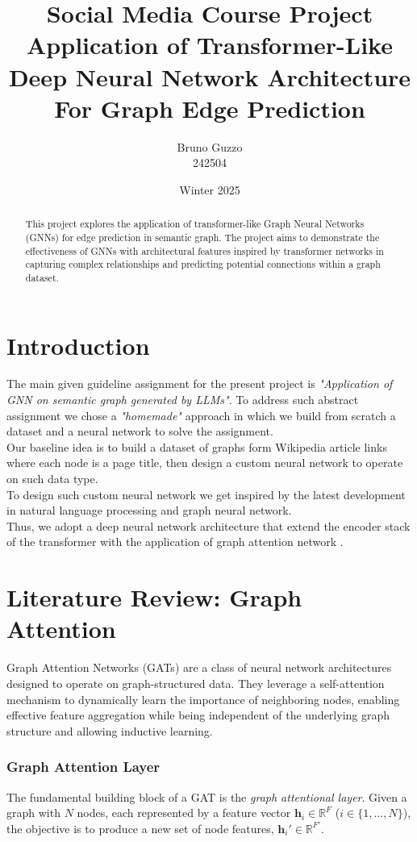 \documentclass[11pt]{article}
\title{Social Media Course Project \\ [1em] \Large Application of Transformer-Like Deep Neural Network Architecture For Graph Edge Prediction}
\author{Bruno Guzzo \\ 242504}
\date{Winter 2025}
\begin{document}
	
	\maketitle
	
	\begin{abstract}
	This project explores the application of transformer-like Graph Neural Networks (GNNs) for edge prediction in semantic graph. The project aims to demonstrate the effectiveness of GNNs with architectural features inspired by transformer networks in capturing complex relationships and predicting potential connections within a graph dataset.
	\end{abstract}
	
	
	\section{Introduction}
	The main given guideline assignment for the present project is \textit{"Application of GNN on semantic graph generated by LLMs"}. To address such abstract assignment we chose a \textit{"homemade"} approach in which we build from scratch a dataset and a neural network to solve the assignment. \\
	Our baseline idea is to build a dataset of graphs form Wikipedia article links where each node is a page title, then design a custom neural network to operate on such data type.\\
	To design such custom neural network we get inspired by the latest development in natural language processing and graph neural network. \\
	Thus, we adopt a deep neural network architecture that extend the encoder stack of the transformer \cite{vaswani2023attentionneed} with the application of graph attention network \cite{veličković2018graphattentionnetworks}.
	
	
	\section{Literature Review: Graph Attention}
	\label{graph_attention}
	Graph Attention Networks (GATs) are a class of neural network architectures designed to operate on graph-structured data. They leverage a self-attention mechanism \cite{vaswani2023attentionneed} to dynamically learn the importance of neighboring nodes, enabling effective feature aggregation while being independent of the underlying graph structure and allowing inductive learning.
	
	\subsubsection{Graph Attention Layer}
	The fundamental building block of a GAT \cite{veličković2018graphattentionnetworks} is the \textit{graph attentional layer}. Given a graph with $N$ nodes, each represented by a feature vector $\mathbf{h}_i \in \mathbb{R}^F$ ($i \in \{1, \dots, N\}$), the objective is to produce a new set of node features, $\mathbf{h}_i' \in \mathbb{R}^{F'}$.
	
\end{document}
